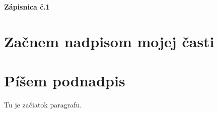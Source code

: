 



	\textbf{{\Huge Zápisnica č.1}}
	
    \section*{Začnem nadpisom mojej časti}
    \section{Píšem podnadpis}
    Tu je začiatok paragrafu.



